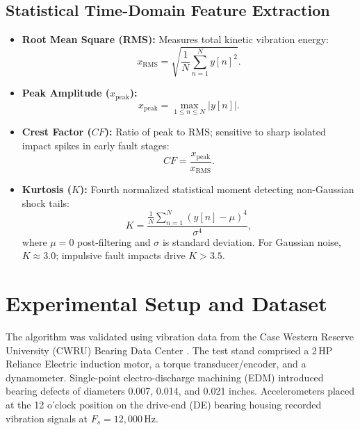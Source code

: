 \documentclass[conference,a4paper]{IEEEtran}
\begin{document}
\subsection{Statistical Time-Domain Feature Extraction}
\begin{itemize}
    \item \textbf{Root Mean Square (RMS):} Measures total kinetic vibration energy:
    \begin{equation}
        x_{\text{RMS}} = \sqrt{\frac{1}{N}\sum_{n=1}^{N} y[n]^2}.
        \label{eq:rms}
    \end{equation}
    \item \textbf{Peak Amplitude ($x_{\text{peak}}$):}
    \begin{equation}
        x_{\text{peak}} = \max_{1 \le n \le N} |y[n]|.
        \label{eq:peak}
    \end{equation}
    \item \textbf{Crest Factor ($CF$):} Ratio of peak to RMS; sensitive to sharp isolated impact spikes in early fault stages:
    \begin{equation}
        CF = \frac{x_{\text{peak}}}{x_{\text{RMS}}}.
        \label{eq:cf}
    \end{equation}
    \item \textbf{Kurtosis ($K$):} Fourth normalized statistical moment detecting non-Gaussian shock tails:
    \begin{equation}
        K = \frac{\frac{1}{N}\sum_{n=1}^{N}(y[n] - \mu)^4}{\sigma^4},
        \label{eq:kurtosis}
    \end{equation}
    where $\mu = 0$ post-filtering and $\sigma$ is standard deviation. For Gaussian noise, $K \approx 3.0$; impulsive fault impacts drive $K > 3.5$.
\end{itemize}

\section{Experimental Setup and Dataset}
The algorithm was validated using vibration data from the Case Western Reserve University (CWRU) Bearing Data Center \cite{loparo2012}. The test stand comprised a 2\,HP Reliance Electric induction motor, a torque transducer/encoder, and a dynamometer. Single-point electro-discharge machining (EDM) introduced bearing defects of diameters 0.007, 0.014, and 0.021 inches. Accelerometers placed at the 12 o'clock position on the drive-end (DE) bearing housing recorded vibration signals at $F_s = 12{,}000$\,Hz.
\end{document}
